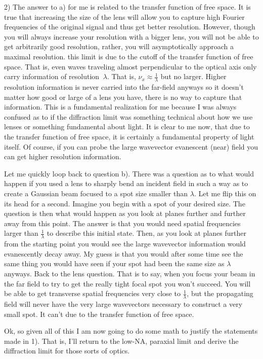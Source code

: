 \documentclass[12pt]{article}
\begin{document}
2) The answer to a) for me is related to the transfer function of free space. It is true that increasing the size of the lens will allow you to capture high Fourier frequencies of the original signal and thus get better resolution. However, though you will always increase your resolution with a bigger lens, you will not be able to get arbitrarily good resolution, rather, you will asymptotically approach a maximal resolution. this limit is due to the cutoff of the transfer function of free space. That is, even waves traveling almost perpendicular to the optical axis only carry information of resolution $~\lambda$. That is, $\nu_x \approx \frac{1}{\lambda}$ but no larger. Higher resolution information is never carried into the far-field anyways so it doesn't matter how good or large of a lens you have, there is no way to capture that information. This is a fundamental realization for me because I was always confused as to if the diffraction limit was something technical about how we use lenses or something fundamental about light. It is clear to me now, that due to the transfer function of free space, it is certainly a fundamental property of light itself. Of course, if you can probe the large wavevector evanescent (near) field you can get higher resolution information.

Let me quickly loop back to question b). There was a question as to what would happen if you used a lens to sharply bend an incident field in such a way as to create a Gaussian beam focused to a spot size smaller than $\lambda$. Let me flip this on its head for a second. Imagine you begin with a spot of your desired size. The question is then what would happen as you look at planes further and further away from this point. The answer is that you would need spatial frequencies larger than $\frac{1}{\lambda}$ to describe this initial state. Then, as you look at planes further from the starting point you would see the large wavevector information would evanescently decay away. My guess is that you would after some time see the same thing you would have seen if your spot had been the same size as $\lambda$ anyways. Back to the lens question. That is to say, when you focus your beam in the far field to try to get the really tight focal spot you won't succeed. You will be able to get transverse spatial frequencies very close to $\frac{1}{\lambda}$, but the propagating field will never have the very large wavevectors necessary to construct a very small spot. It can't due to the transfer function of free space.

Ok, so given all of this I am now going to do some math to justify the statements made in 1). That is, I'll return to the low-NA, paraxial limit and derive the diffraction limit for those sorts of optics.
\end{document}
